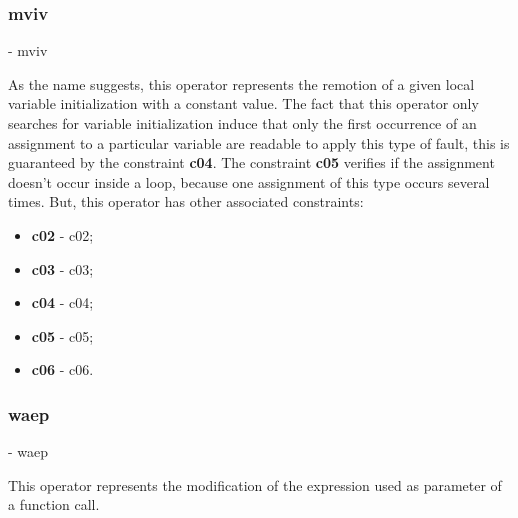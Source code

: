 	\subsubsection{\textbf{\acs{mviv}}} - \Acl{mviv}
	\hypertarget{mviv}{}

	As the name suggests, this operator represents the remotion of a given local variable initialization with a constant value. The fact that this operator only searches for variable initialization induce that only the first occurrence of an assignment to a particular variable are readable to apply this type of fault, this is guaranteed by the constraint \textbf{\acs{c04}}. The constraint \textbf{\acs{c05}} verifies if the assignment doesn't occur inside a loop, because one assignment of this type occurs several times. But, this operator has other associated constraints:

	\begin{itemize}
		\item \textbf{\acs{c02}} - \Acl{c02};
		\item \textbf{\acs{c03}} - \Acl{c03};
		\item \textbf{\acs{c04}} - \Acl{c04};
		\item \textbf{\acs{c05}} - \Acl{c05};
		\item \textbf{\acs{c06}} - \Acl{c06}.
	\end{itemize}




	\subsubsection{\textbf{\acs{waep}}} - \Acl{waep}
	\hypertarget{waep}{}

	This operator represents the modification of the expression used as parameter of a function call.


